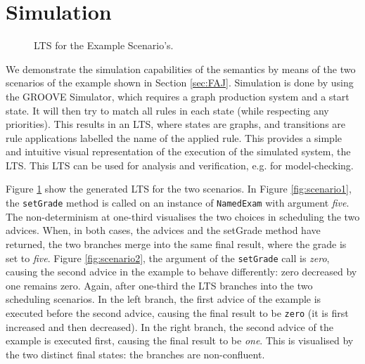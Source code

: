 \section{Simulation}\label{sec:simulation}

\begin{figure}
\centering
{}\qquad
{}
\caption{LTS for the Example Scenario's.}
\label{fig:lts_examples}
\end{figure}

We demonstrate the simulation capabilities of the semantics by means of the two scenarios of the example shown in Section \ref{sec:FAJ}. Simulation is done by using the GROOVE Simulator, which requires a graph production system and a start state. It will then try to match all rules in each state (while respecting any priorities). This results in an LTS, where states are graphs, and transitions are rule applications labelled the name of the applied rule. This provides a simple and intuitive visual representation of the execution of the simulated system, the LTS. This LTS can be used for analysis and verification, e.g. for model-checking.

Figure \ref{fig:lts_examples} show the generated LTS for the two scenarios. In Figure \ref{fig:scenario1}, the {\tt setGrade} method is called on an instance of {\tt NamedExam} with argument \emph{five}. The non-determinism at one-third visualises the two choices in scheduling the two advices. When, in both cases, the advices and the setGrade method have returned, the two branches merge into the same final result, where the grade is set to \emph{five}.
Figure \ref{fig:scenario2}, the argument of the {\tt setGrade} call is \emph{zero}, causing the second advice in the example to behave differently: zero decreased by one remains zero. Again, after one-third the LTS branches into the two scheduling scenarios. In the left branch, the first advice of the example is executed before the second advice, causing the final result to be {\tt zero} (it is first increased and then decreased). In the right branch, the second advice of the example is executed first, causing the final result to be \emph{one}. This is visualised by the two distinct final states: the branches are non-confluent. \\
